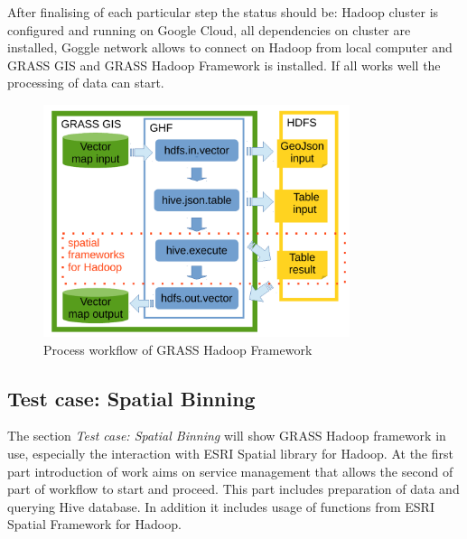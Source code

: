 \documentclass[a4paper,12pt,oneside]{report}
\begin{document}
	After finalising of each particular step the status should be: Hadoop cluster is configured and running on Google Cloud, all dependencies on cluster are installed, Goggle network allows to connect on Hadoop from local computer and GRASS GIS and GRASS Hadoop Framework is installed. If all works well the processing of data can start. 
		\begin{figure}[!htbp]
			\centering
			\includegraphics[width=0.8\textwidth]{./img/modules_schema.pdf}
			\caption[GHF workflow]{\centering Process workflow of GRASS Hadoop Framework 
			}
			\label{wokrflow}
		\end{figure} 
		
	
	        \subsection{Test case: Spatial Binning}\label{spatial_anal_usage}

	The section \textit{Test case: Spatial Binning} will show GRASS Hadoop framework in use, especially 
	the interaction with ESRI Spatial library for Hadoop. 
	At the first part introduction of work aims on service management that allows 
	the second of part of workflow to start and proceed. This part includes preparation of data
	and querying Hive database. In addition it includes usage of functions from ESRI
	Spatial Framework for Hadoop.
	
\end{document}
